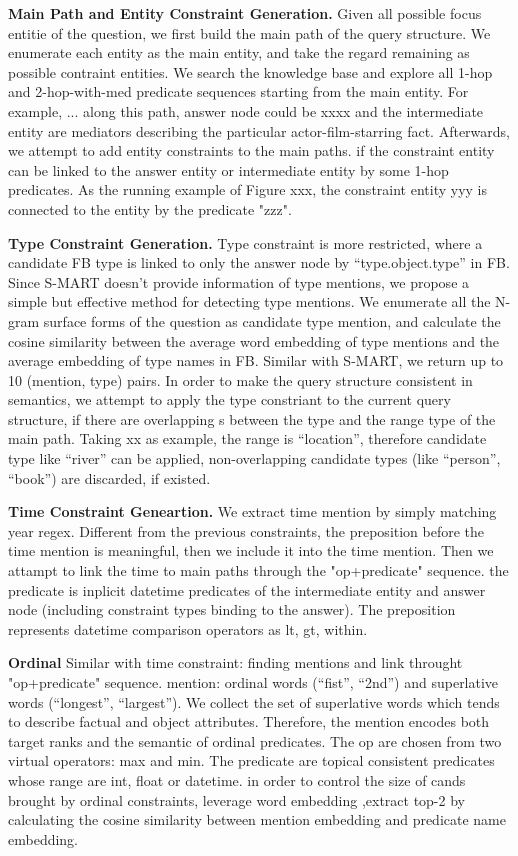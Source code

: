 \textbf{Main Path and Entity Constraint Generation.} 
Given all possible focus entitie of the question, we first build the main path of the query structure.
We enumerate each entity as the main entity, and take the regard remaining as possible contraint entities.
We search the knowledge base and explore all 1-hop and 2-hop-with-med predicate sequences
starting from the main entity.
For example, ...
along this path, answer node could be xxxx and the intermediate entity are mediators describing the particular actor-film-starring fact.
Afterwards, we attempt to add entity constraints to the main paths.
if the constraint entity can be linked to the answer entity or intermediate entity by some 1-hop predicates.
As the running example of Figure xxx, the constraint entity yyy is connected to the entity by the predicate "zzz".

\textbf{Type Constraint Generation.}
Type constraint is more restricted, where a candidate FB type is linked to only the answer node by ``type.object.type'' in FB.
Since S-MART doesn't provide information of type mentions, we propose a simple but effective method for detecting type mentions.
We enumerate all the N-gram surface forms of the question as candidate type mention, and calculate the cosine similarity
between the average word embedding of type mentions and the average embedding of type names in FB.
Similar with S-MART, we return up to 10 (mention, type) pairs.
In order to make the query structure consistent in semantics, we attempt to apply the type
constriant to the current query structure, if there are overlapping s between the type
and the range type of the main path.
Taking xx as example, the range is ``location'', therefore candidate type like ``river'' can be applied,
non-overlapping candidate types (like ``person'', ``book'') are discarded, if existed.

\textbf{Time Constraint Geneartion.}
We extract time mention by simply matching year regex.
Different from the previous constraints, the preposition before the time mention is meaningful,
then we include it into the time mention.
Then we attampt to link the time to main paths through the "op+predicate" sequence.
the predicate is inplicit datetime predicates of the 
intermediate entity and answer node (including constraint types binding to the answer).
The preposition represents datetime comparison operators as lt, gt, within.

\textbf{Ordinal}
Similar with time constraint: finding mentions and link throught "op+predicate" sequence.
mention: ordinal words (``fist'', ``2nd'') and superlative words (``longest'', ``largest'').
We collect the set of superlative words which tends to describe factual and object attributes.
Therefore, the mention encodes both target ranks and the semantic of ordinal predicates.
The op are chosen from two virtual operators: max and min.
The predicate are topical consistent predicates whose range are int, float or datetime.
in order to control the size of cands brought by ordinal constraints,
leverage word embedding ,extract top-2 by calculating the cosine similarity
between mention embedding and predicate name embedding.

